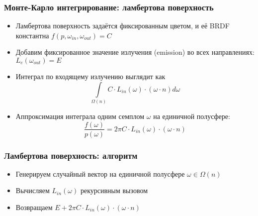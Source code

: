 \documentclass[10pt]{beamer}
\begin{document}
\begin{frame}[fragile]
\frametitle{Монте-Карло интегрирование: ламбертова поверхность}
\begin{itemize}
\item Ламбертова поверхность задаётся фиксированным цветом, и её BRDF константна \begin{math}f(p, \omega_{in}, \omega_{out}) = C\end{math}
\pause
\item Добавим фиксированное значение излучения (emission) во всех направлениях: \begin{math}L_e(\omega_{out}) = E\end{math}
\pause
\item Интеграл по входящему излучению выглядит как
\begin{equation*}
\int\limits_{\Omega(n)} C\cdot L_{in}(\omega)\cdot (\omega \cdot n) d\omega
\end{equation*}
\pause
\item Аппроксимация интеграла одним семплом \begin{math}\omega\end{math} на единичной полусфере:
\begin{equation*}
\frac{f(\omega)}{p(\omega)} = 2\pi C \cdot L_{in}(\omega) \cdot (\omega \cdot n)
\end{equation*}
\end{itemize}
\end{frame}

\begin{frame}[fragile]
\frametitle{Ламбертова поверхность: алгоритм}
\begin{itemize}
\item Генерируем случайный вектор на единичной полусфере \begin{math}\omega \in \Omega(n)\end{math}
\pause
\item Вычисляем \begin{math}L_{in}(\omega)\end{math} рекурсивным вызовом
\pause
\item Возвращаем \begin{math}E + 2\pi C \cdot L_{in}(\omega) \cdot (\omega \cdot n)\end{math}
\end{itemize}
\end{frame}
\end{document}

